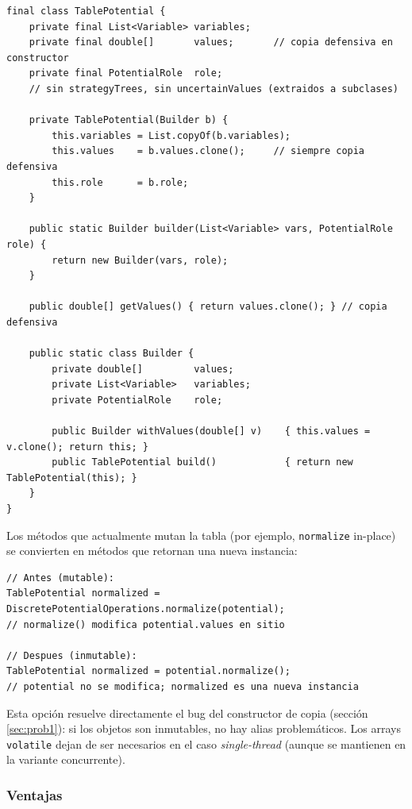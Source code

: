\documentclass[11pt,a4paper]{article}
\newcommand{\code}[1]{\texttt{#1}}
\begin{document}
\begin{lstlisting}[caption={Builder para \code{TablePotential} inmutable}]
final class TablePotential {
    private final List<Variable> variables;
    private final double[]       values;       // copia defensiva en constructor
    private final PotentialRole  role;
    // sin strategyTrees, sin uncertainValues (extraidos a subclases)

    private TablePotential(Builder b) {
        this.variables = List.copyOf(b.variables);
        this.values    = b.values.clone();     // siempre copia defensiva
        this.role      = b.role;
    }

    public static Builder builder(List<Variable> vars, PotentialRole role) {
        return new Builder(vars, role);
    }

    public double[] getValues() { return values.clone(); } // copia defensiva

    public static class Builder {
        private double[]         values;
        private List<Variable>   variables;
        private PotentialRole    role;

        public Builder withValues(double[] v)    { this.values = v.clone(); return this; }
        public TablePotential build()            { return new TablePotential(this); }
    }
}
\end{lstlisting}

Los métodos que actualmente mutan la tabla (por ejemplo, \code{normalize} in-place)
se convierten en métodos que retornan una nueva instancia:

\begin{lstlisting}[caption={Normalización devuelve nueva instancia en lugar de mutar}]
// Antes (mutable):
TablePotential normalized = DiscretePotentialOperations.normalize(potential);
// normalize() modifica potential.values en sitio

// Despues (inmutable):
TablePotential normalized = potential.normalize();
// potential no se modifica; normalized es una nueva instancia
\end{lstlisting}

Esta opción resuelve directamente el bug del constructor de copia (sección
\ref{sec:prob1}): si los objetos son inmutables, no hay alias problemáticos.
Los arrays \code{volatile} dejan de ser necesarios en el caso \emph{single-thread}
(aunque se mantienen en la variante concurrente).

\subsubsection*{Ventajas}
\end{document}
